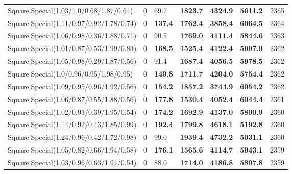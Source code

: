 \begin{tabular}{lrllllr}
 Square|Special(1.03/1.0/0.68/1.87/0.64)                       &             0   & 69.7           & \textbf{1823.7} & \textbf{4324.9} & \textbf{5611.2} &         2365 \\
 Square|Special(1.11/0.97/0.92/1.78/0.74)                      &             0   & \textbf{137.4} & \textbf{1762.4} & \textbf{3858.4} & \textbf{6064.5} &         2364 \\
 Square|Special(1.06/0.98/0.36/1.88/0.71)                      &             0   & 90.5           & \textbf{1769.0} & \textbf{4111.4} & \textbf{5844.6} &         2363 \\
 Square|Special(1.01/0.87/0.53/1.99/0.83)                      &             0   & \textbf{168.5} & \textbf{1525.4} & \textbf{4122.4} & \textbf{5997.9} &         2362 \\
 Square|Special(1.05/0.98/0.29/1.87/0.56)                      &             0   & 91.4           & \textbf{1687.4} & \textbf{4056.5} & \textbf{5978.5} &         2362 \\
 Square|Special(1.0/0.96/0.95/1.98/0.95)                       &             0   & \textbf{140.8} & \textbf{1711.7} & \textbf{4204.0} & \textbf{5754.4} &         2362 \\
 Square|Special(1.09/0.95/0.96/1.92/0.56)                      &             0   & \textbf{154.2} & \textbf{1857.2} & \textbf{3744.9} & \textbf{6054.2} &         2362 \\
 Square|Special(1.06/0.87/0.55/1.88/0.56)                      &             0   & \textbf{177.8} & \textbf{1530.4} & \textbf{4052.4} & \textbf{6044.4} &         2361 \\
 Square|Special(1.02/0.93/0.39/1.95/0.54)                      &             0   & \textbf{174.2} & \textbf{1692.9} & \textbf{4137.0} & \textbf{5800.9} &         2360 \\
 Square|Special(1.14/0.92/0.43/1.85/0.99)                      &             0   & \textbf{192.4} & \textbf{1799.8} & \textbf{4618.1} & \textbf{5192.8} &         2360 \\
 Square|Special(1.24/0.96/0.42/1.72/0.98)                      &             0   & 99.0           & \textbf{1939.4} & \textbf{4732.2} & \textbf{5031.1} &         2360 \\
 Square|Special(1.05/0.82/0.66/1.94/0.58)                      &             0   & \textbf{176.1} & \textbf{1565.6} & \textbf{4114.7} & \textbf{5943.1} &         2359 \\
 Square|Special(1.03/0.96/0.63/1.94/0.54)                      &             0   & 88.0           & \textbf{1714.0} & \textbf{4186.8} & \textbf{5807.8} &         2359 \\

\end{tabular}
